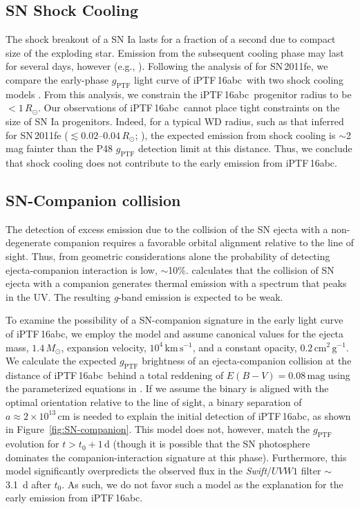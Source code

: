 \documentclass[twocolumn]{aastex61}
\newcommand{\sm}{M_\odot}
\newcommand{\sr}{R_\odot}
\newcommand{\abc}{iPTF\,16abc}
\begin{document}
\subsection{SN Shock Cooling}

The shock breakout of a SN Ia lasts for a fraction of a second due to
compact size of the exploding star. Emission from the subsequent 
cooling phase may last for several days, however (e.g., 
\citealt{2010ApJ...708..598P}). Following the analysis of \citet{2012ApJ...744L..17B} for SN\,2011fe, we
compare the early-phase $g_\mathrm{PTF}$ light curve of \abc\ with
two shock cooling models \citep{2011ApJ...728...63R, 
2010ApJ...708..598P}. From this analysis, we constrain the \abc\ 
progenitor radius to be $<1\,\sr$. Our observations of \abc\ cannot 
place tight constraints on the size of SN Ia progenitors. Indeed, 
for a typical WD radius, such as that inferred for SN\,2011fe 
($\lesssim 0.02$--$0.04\,\sr$; \citealt{2012ApJ...744L..17B, 
2014ApJ...784...85P}), the expected emission from shock cooling is 
$\sim$2 mag fainter than the P48 $g_\mathrm{PTF}$ detection limit at this distance. 
Thus, we conclude that shock cooling does not contribute to the 
early emission from \abc.

\subsection{SN-Companion collision}
\label{sec:companion}

The detection of excess emission due to the collision of the SN ejecta 
with a non-degenerate companion requires a favorable orbital 
alignment relative to the line of sight. Thus, from geometric 
considerations alone the probability of detecting ejecta-companion 
interaction is low, $\sim$10\%. \citet{2010ApJ...708.1025K} calculates that the 
collision of SN ejecta with a companion  
generates thermal emission with a spectrum that peaks in the 
UV. The resulting \textit{g}-band emission is expected to be weak.

To examine the possibility of a SN-companion signature in the early
light curve of \abc, we employ the \citet{2010ApJ...708.1025K}
model and assume canonical values for the ejecta mass, $1.4\,\sm$, expansion velocity,
$10^{4}\,\textrm{km}\,\textrm{s}^{-1}$, and a constant opacity, 
$0.2\,\textrm{cm}^2\,\textrm{g}^{-1}$. We calculate the expected 
$g_\mathrm{PTF}$ brightness of an ejecta-companion collision at the 
distance of \abc\ behind a total reddening of $E(B-V) = 0.08 \, \mathrm{mag}$ using the parameterized equations in 
\citet{2012ApJ...749...18B}. If we assume the binary is aligned with the optimal orientation relative to the line of sight, a binary separation of $a \approx 2 \times 10^{13}\, \mathrm{cm}$ is needed to explain the initial detection of \abc, as shown in Figure~\ref{fig:SN-companion}. This model does not, however, match the $g_\mathrm{PTF}$ evolution for $t > t_0 + 1 \, \mathrm{d}$ (though it is possible that the SN photosphere dominates the companion-interaction signature at this phase). Furthermore, this model significantly overpredicts the observed flux in the \textit{Swift}/$UVW1$ filter $\sim$3.1~d after $t_0$. As such, we do not favor such a model as the explanation for the early emission from \abc.
\end{document}
